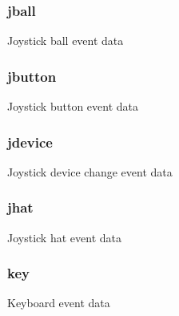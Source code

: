 \subsubsection[{\texorpdfstring{jball}{jball}}]{ jball}\hypertarget{union_s_d_l___event_a3a7002a9bea0e40a43f41df855bc9782}{}\label{union_s_d_l___event_a3a7002a9bea0e40a43f41df855bc9782}
Joystick ball event data 
\subsubsection[{\texorpdfstring{jbutton}{jbutton}}]{ jbutton}\hypertarget{union_s_d_l___event_ad723f7a3adf34248d74786401a257cd3}{}\label{union_s_d_l___event_ad723f7a3adf34248d74786401a257cd3}
Joystick button event data 
\subsubsection[{\texorpdfstring{jdevice}{jdevice}}]{ jdevice}\hypertarget{union_s_d_l___event_a3cc807a742e4243fe2e46276ebac7290}{}\label{union_s_d_l___event_a3cc807a742e4243fe2e46276ebac7290}
Joystick device change event data 
\subsubsection[{\texorpdfstring{jhat}{jhat}}]{ jhat}\hypertarget{union_s_d_l___event_aea419b4a0b6aa542b5e3c8378b488dd7}{}\label{union_s_d_l___event_aea419b4a0b6aa542b5e3c8378b488dd7}
Joystick hat event data 
\subsubsection[{\texorpdfstring{key}{key}}]{ key}\hypertarget{union_s_d_l___event_a2944bdaafa644e5dd1007a8514d73977}{}\label{union_s_d_l___event_a2944bdaafa644e5dd1007a8514d73977}
Keyboard event data 
